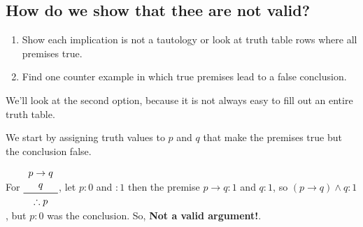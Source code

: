 \documentclass{article}
\begin{document}
\subsection*{How do we show that thee are not valid?}

\begin{enumerate}
\item Show each implication is not a tautology or look at truth table
  rows where all premises true.
\item Find one counter example in which true premises lead to a false
  conclusion.
\end{enumerate}

We'll look at the second option, because it is not always easy to fill
out an entire truth table.

We start by assigning truth values to $p$ and $q$ that make the
premises true but the conclusion false.

For
$\begin{array}{c}p\rightarrow{}q\\q\\\midrule\therefore{}p\\\end{array}$,
  let $p: 0$ and $:1$ then the premise $p\rightarrow{}q:1$ and $q:1$,
  so $(p\rightarrow{}q)\wedge{}q:1$, but $p:0$ was the conclusion. So,
  \textbf{Not a valid argument!}.
\end{document}
